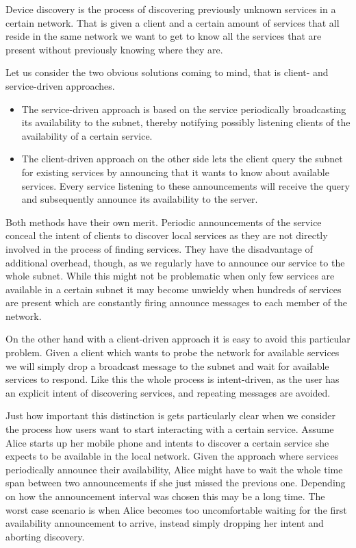 Device discovery is the process of discovering previously unknown services in a certain network.
That is given a client and a certain amount of services that all reside in the same network we want to get to know all the services that are present without previously knowing where they are.

Let us consider the two obvious solutions coming to mind, that is client- and service-driven approaches.
\begin{itemize}
    \item The service-driven approach is based on the service periodically broadcasting its availability to the subnet, thereby notifying possibly listening clients of the availability of a certain service.
    \item The client-driven approach on the other side lets the client query the subnet for existing services by announcing that it wants to know about available services.
        Every service listening to these announcements will receive the query and subsequently announce its availability to the server.
\end{itemize}

Both methods have their own merit.
Periodic announcements of the service conceal the intent of clients to discover local services as they are not directly involved in the process of finding services.
They have the disadvantage of additional overhead, though, as we regularly have to announce our service to the whole subnet.
While this might not be problematic when only few services are available in a certain subnet it may become unwieldy when hundreds of services are present which are constantly firing announce messages to each member of the network.

On the other hand with a client-driven approach it is easy to avoid this particular problem.
Given a client which wants to probe the network for available services we will simply drop a broadcast message to the subnet and wait for available services to respond.
Like this the whole process is intent-driven, as the user has an explicit intent of discovering services, and repeating messages are avoided.

Just how important this distinction is gets particularly clear when we consider the process how users want to start interacting with a certain service.
Assume Alice starts up her mobile phone and intents to discover a certain service she expects to be available in the local network.
Given the approach where services periodically announce their availability, Alice might have to wait the whole time span between two announcements if she just missed the previous one.
Depending on how the announcement interval was chosen this may be a long time.
The worst case scenario is when Alice becomes too uncomfortable waiting for the first availability announcement to arrive, instead simply dropping her intent and aborting discovery.

